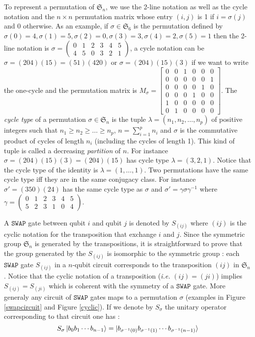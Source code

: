 \documentclass[a4paper,12pt,fleqn]{article}
\newcommand\swap{\mathtt{SWAP}}
\newcommand\SYM[1][n]{\mathfrak{S}_{#1}}
\renewcommand\geq{\geqslant}
\begin{document}
To represent a permutation of $\SYM$, we use the  2-line notation as well as the cycle notation and the $n\times n$ permutation matrix whose entry $(i,j)$ is 1
if $i=\sigma(j)$ and 0 otherwise. 
As an example, if $\sigma\in\SYM[6]$ is the permutation defined by $\sigma(0)=4,\sigma(1)=5,\sigma(2)=0,\sigma(3)=3,\sigma(4)=2,
\sigma(5)=1$ then the 2-line notation is $\sigma=\begin{pmatrix}0&1&2&3&4&5\\4&5&0&3&2&1\end{pmatrix}$, a cycle notation can be
$\sigma=(204)(15)=(51)(420)$ or $\sigma=(204)(15)(3)$ if we want to
write the one-cycle and the permutation matrix is
$M_{\sigma}=
\begin{bmatrix}
  0&0&1&0&0&0\\
  0&0&0&0&0&1\\
  0&0&0&0&1&0\\
  0&0&0&1&0&0\\
  1&0&0&0&0&0\\
  0&1&0&0&0&0
\end{bmatrix}$.
The \emph{cycle type} of a permutation $\sigma\in\SYM$ is the tuple $\lambda=(n_1,n_2,\dots,n_p)$ of positive integers such that $n_1\geq n_2\geq \dots\geq n_p$,
$n=\sum_{i=1}^pn_i$ and
$\sigma$ is the commutative product of cycles of length $n_i$ (including the cycles of length 1). This kind of tuple is called a decreasing \emph{partition} of $n$.
For instance $\sigma=(204)(15)(3)=(204)(15)$ has cycle type $\lambda=(3,2,1)$. Notice that the cycle type of the identity is $\lambda=(1,\dots,1)$.
Two permutations have the same cycle type iff they are in the same conjugacy class. For instance $\sigma'=(350)(24)$ has the same cycle type as $\sigma$ and $\sigma'=\gamma\sigma\gamma^{-1}$ where $\gamma=\begin{pmatrix}0&1&2&3&4&5\\5&2&3&1&0&4\end{pmatrix}$.


A $\swap$ gate between qubit $i$ and qubit $j$ is denoted by $S_{(ij)}$ where $(ij)$ is the cyclic notation for the transposition that exchange $i$ and $j$.
Since the symmetric group $\SYM$ is generated by the transpositions, it is straightforward to prove that the group generated by the $S_{(ij)}$ is isomorphic to the symmetric group  : each $\swap$ gate $S_{(ij)}$ in a $n$-qubit circuit corresponds to the transposition $(ij)$ in $\SYM$. Notice that the cyclic notation of a transposition (\textit{i.e.} $(ij)=(ji)$) implies $S_{(ij)}=S_{(ji)}$ which is coherent with the symmetry of a $\swap$ gate. More generaly any circuit  of $\swap$ gates maps to a permutation $\sigma$ (examples in Figure \ref{swapcircuit} and Figure \ref{cyclic}). If we denote by $S_{\sigma}$ the unitary operator corresponding to that circuit one has :
\begin{equation}\label{swapsigma}
  S_{\sigma}\ket{b_0b_1\cdots b_{n-1}}=\ket{b_{\sigma^{-1}(0)}b_{\sigma^{-1}(1)}\cdots b_{\sigma^{-1}(n-1)}}
\end{equation}
\end{document}
